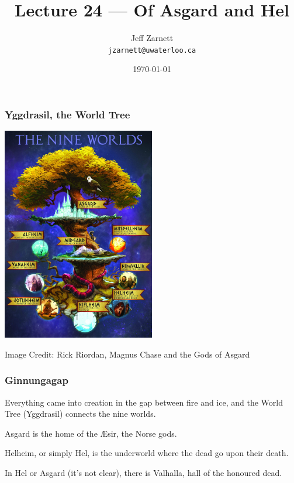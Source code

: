 

\title{Lecture 24 --- Of Asgard and Hel }

\author{Jeff Zarnett \\ \small \texttt{jzarnett@uwaterloo.ca}}
\date{\today}




\begin{frame}
	\titlepage

\end{frame}


\begin{frame}
	\frametitle{Yggdrasil, the World Tree}

	\begin{center}
		\includegraphics[width=0.5\textwidth]{images/Yggdrasil.jpg}
	\end{center}
	\hfill Image Credit: Rick Riordan, Magnus Chase and the Gods of Asgard
\end{frame}


\begin{frame}
	\frametitle{Ginnungagap}

	Everything came into creation in the gap between fire and ice, and the World Tree (Yggdrasil) connects the nine worlds.

	Asgard is the home of the \AE sir, the Norse gods.

	Helheim, or simply Hel, is the underworld where the dead go upon their death.

	In Hel or Asgard (it's not clear), there is Valhalla, hall of the honoured dead.

\end{frame}

